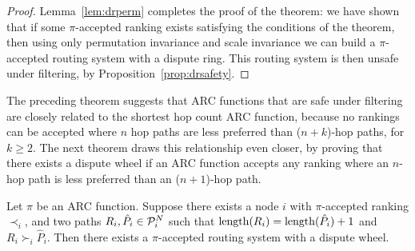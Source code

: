 \begin{proof}
Lemma~\ref{lem:drperm} completes the proof of the theorem: we have shown
that if some $\pi$-accepted ranking exists satisfying the
conditions of the theorem, then using only permutation invariance and
scale invariance we can build a $\pi$-accepted routing system with a
dispute ring.  This routing system is then unsafe under filtering,
by Proposition~\ref{prop:drsafety}.
\end{proof}

The preceding theorem suggests that ARC functions that are safe under
filtering are closely related to the shortest hop count ARC function,
because no rankings can be accepted where $n$ hop paths are
less preferred than ($n+k$)-hop paths, for $k\geq 2$.  The next theorem
draws this relationship even closer, by proving that there exists a
dispute wheel if an ARC function accepts any ranking
where an $n$-hop path is less preferred than an ($n+1$)-hop path.

\begin{theorem}
\label{th:dw}
Let $\pi$ be an ARC function.  Suppose there exists a node $i$
with $\pi$-accepted ranking $\prec_i$, and two paths $R_i,
\hat{P}_i \in \P_i^N$ such that $\length(R_i) = \length(\hat{P}_i) + 1$
and $R_i \succ_i \hat{P}_i$.  Then there exists a $\pi$-accepted
routing system with a dispute wheel.
\end{theorem}



